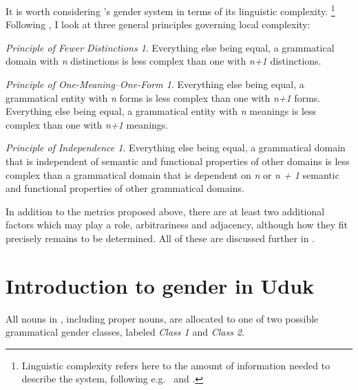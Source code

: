 \documentclass[output=collectionpaper,hidelinks]{langscibook}
\theoremstyle{remark}
\newtheorem*{principle-distinct}{Principle of Fewer Distinctions}
\newtheorem*{principle-transparency}{Principle of One-Meaning–One-Form}
\newtheorem*{principle-independence}{Principle of Independence}
\begin{document}
It is worth considering 's gender system in terms of its linguistic
complexity.%
\footnote{Linguistic complexity refers here to the amount of
information needed to describe the system, following e.g.\ \citet{Dahl2004} and \citet{Miestamo2008}.} %
Following \citet[50]{DiGarbo2016}, I look at three
general principles governing local complexity:

\begin{principle-distinct}
\hfill \break
Everything else being equal, a grammatical domain with \emph{n} distinctions is less complex than one with \emph{n+1} distinctions.
\end{principle-distinct}

\begin{principle-transparency}
\hfill \break
Everything else being equal, a grammatical entity with \emph{n} forms is less complex than one with \emph{n+1} forms. \newline
Everything else being equal, a grammatical entity with \emph{n} meanings is less complex than one with \emph{n+1} meanings.
\end{principle-transparency}

\begin{principle-independence}
\hfill \break
Everything else being equal, a grammatical domain that is independent of semantic and functional properties of other domains is less complex than a grammatical domain that is dependent on \emph{n} or \emph{n + 1} semantic and functional properties of other grammatical domains.
\end{principle-independence}

In addition to the metrics proposed above, there are at least two additional
factors which may play a role, arbitrariness and adjacency, although how they
fit precisely remains to be determined. All of these are discussed further in
.

\section{Introduction to gender in Uduk}
\label{sec:Introduction_to_gender_in_Uduk}

All nouns in , including proper nouns, are allocated to one of two
possible grammatical gender classes, labeled \emph{Class 1} and \emph{Class
2}.
\end{document}
